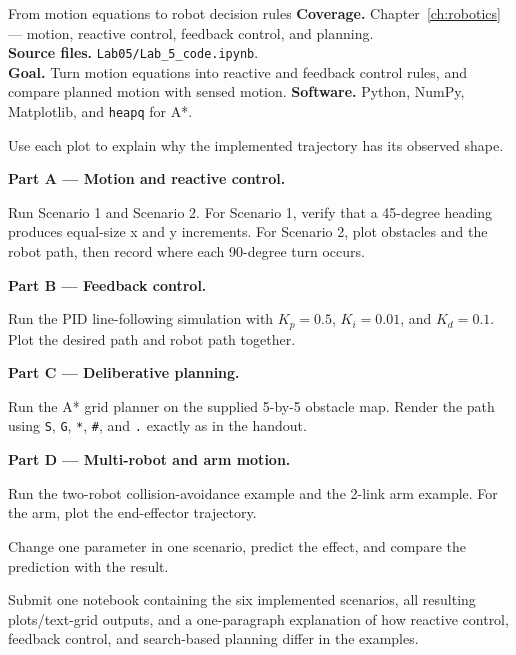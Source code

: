 
\begin{labproject}{From motion equations to robot decision rules}
\textbf{Coverage.} Chapter~\ref{ch:robotics} --- motion, reactive control, feedback control, and planning.\\
\textbf{Source files.} \texttt{Lab05/Lab\_5\_code.ipynb}.\\
\textbf{Goal.} Turn motion equations into reactive and feedback control rules, and compare planned motion with sensed motion.
\textbf{Software.} Python, NumPy, Matplotlib, and \texttt{heapq} for A*.

\begin{labmode}
Use each plot to explain why the implemented trajectory has its observed shape.
\end{labmode}

\medskip\noindent\textbf{Part A --- Motion and reactive control.}\par
Run Scenario 1 and Scenario 2. For Scenario 1, verify that a 45-degree heading produces equal-size x and y increments. For Scenario 2, plot obstacles and the robot path, then record where each 90-degree turn occurs.

\medskip\noindent\textbf{Part B --- Feedback control.}\par
Run the PID line-following simulation with \(K_p=0.5\), \(K_i=0.01\), and \(K_d=0.1\). Plot the desired path and robot path together.

\medskip\noindent\textbf{Part C --- Deliberative planning.}\par
Run the A* grid planner on the supplied 5-by-5 obstacle map. Render the path using \texttt{S}, \texttt{G}, \texttt{*}, \texttt{\#}, and \texttt{.} exactly as in the handout.

\medskip\noindent\textbf{Part D --- Multi-robot and arm motion.}\par
Run the two-robot collision-avoidance example and the 2-link arm example. For the arm, plot the end-effector trajectory.

\begin{tryit}
Change one parameter in one scenario, predict the effect, and compare the prediction with the result.
\end{tryit}
\end{labproject}

\begin{labdeliverable}
Submit one notebook containing the six implemented scenarios, all resulting plots/text-grid outputs, and a one-paragraph explanation of how reactive control, feedback control, and search-based planning differ in the examples.
\end{labdeliverable}
